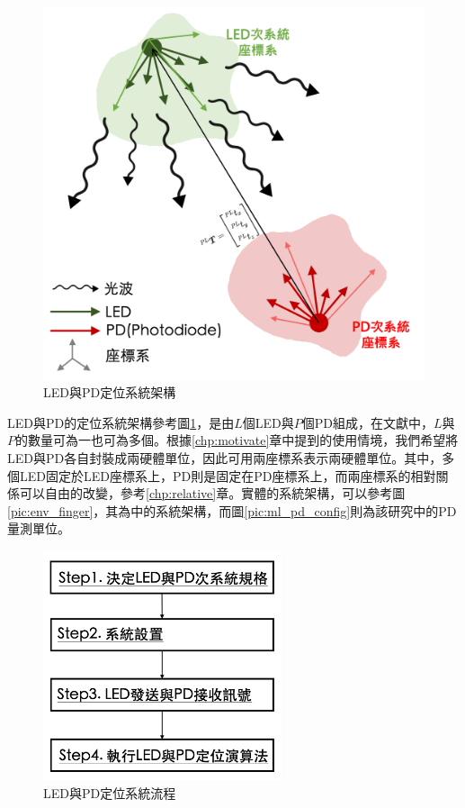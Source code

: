 \begin{figure}[htpb]
    \centering
    \includegraphics[width=12cm]{ch2pic/lp_system_structure.png}
    \caption{LED與PD定位系統架構}
    \label{pic:lp_system_structure}
\end{figure}




LED與PD的定位系統架構參考圖\ref{pic:lp_system_structure}，是由$L$個LED與$P$個PD組成，在文獻中，$L$與$P$的數量可為一也可為多個。根據\ref{chp:motivate}章中提到的使用情境，我們希望將LED與PD各自封裝成兩硬體單位，因此可用兩座標系表示兩硬體單位。其中，多個LED固定於LED座標系上，PD則是固定在PD座標系上，而兩座標系的相對關係可以自由的改變，參考\ref{chp:relative}章。實體的系統架構，可以參考圖\ref{pic:env_finger}，其為\cite{case:ml}中的系統架構，而圖\ref{pic:ml_pd_config}則為該研究中的PD量測單位。

\begin{figure}[htpb]
    \centering
    \includegraphics[width=7cm]{ch2pic/lp_system_flow.png}
    \caption{LED與PD定位系統流程}
    \label{pic:lp_system_flow}
\end{figure}

